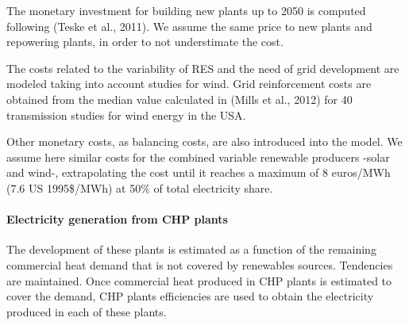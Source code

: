 The monetary investment for building new plants up to 2050 is computed following (Teske et al.,
2011). We assume the same price to new plants and repowering plants, in order to not understimate the cost. 

The costs related to the variability of RES and the need of grid development are modeled taking into account studies for wind. Grid reinforcement costs are obtained from the median value calculated in (Mills et al., 2012)  for 40 transmission studies for wind energy
in the USA.

Other monetary costs, as balancing costs, are also introduced into the model. We assume here similar costs for the combined variable
renewable producers -solar and wind-, extrapolating the cost until it reaches a maximum of 8
euros/MWh (7.6 US 1995\$/MWh) at 50\% of total electricity share.


\paragraph{Electricity generation from CHP plants}

The development of these plants is estimated as a function of the remaining commercial heat demand that is not covered by renewables sources. Tendencies are maintained. Once commercial heat produced in CHP plants is estimated to cover the demand, CHP plants efficiencies are used to obtain the electricity produced
in each of these plants.
